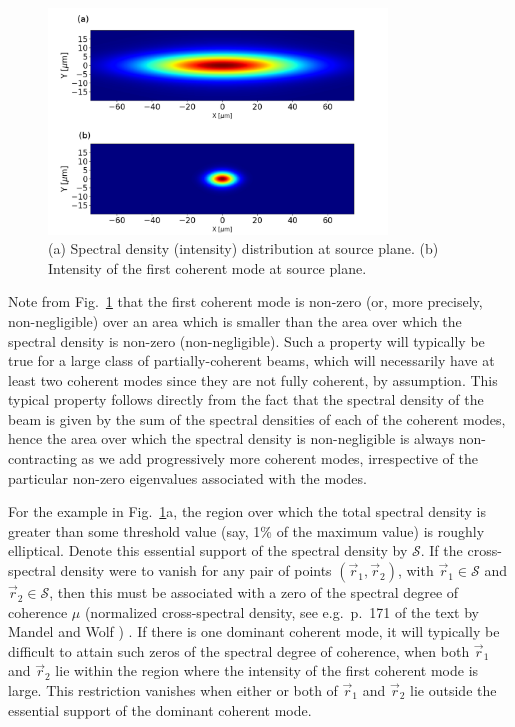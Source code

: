 \documentclass[%
 reprint,
 amsmath,amssymb,
 aps,
]{revtex4-1}
\begin{document}
\begin{figure}%
\includegraphics[width=9.0cm]{Figures/spectral_density.png}
\caption{(a) Spectral density (intensity) distribution at source plane. (b) Intensity of the first coherent mode at source plane.}
\label{spectral_density}
\end{figure}

Note from Fig.~\ref{spectral_density} that the first coherent mode is non-zero (or, more precisely, non-negligible) over an area which is smaller than the area over which the spectral density is non-zero (non-negligible). Such a property will typically be true for a large class of partially-coherent beams, which will necessarily have at least two coherent modes since they are not fully coherent, by assumption.  This typical property follows directly from the fact that the spectral density of the beam is given by the sum of the spectral densities of each of the coherent modes, hence the area over which the spectral density is non-negligible is always non-contracting as we add progressively more coherent modes, irrespective of the particular non-zero eigenvalues associated with the modes.  

For the example in Fig.~\ref{spectral_density}a, the region over which the total spectral density is greater than some threshold value (say, 1\% of the maximum value) is roughly elliptical.  Denote this essential support of the spectral density by $\mathcal{S}$.  If the cross-spectral density were to vanish for any pair of points $(\vec{r}_1,\vec{r}_2)$, with $\vec{r}_1 \in \mathcal{S}$ and $\vec{r}_2 \in \mathcal{S}$, then this must be associated with a zero of the spectral degree of coherence $\mu$ (normalized cross-spectral density, see e.g.~p.~171 of the text by Mandel and Wolf \cite{mandel_wolf}) \cite{GburSPIE}. If there is one dominant coherent mode, it will typically be difficult to attain such zeros of the spectral degree of coherence, when both $\vec{r}_1$ and $\vec{r}_2$ lie within the region where the intensity of the first coherent mode is large.  This restriction vanishes when either or both of $\vec{r}_1$ and $\vec{r}_2$ lie outside the essential support of the dominant coherent mode.  
\end{document}
